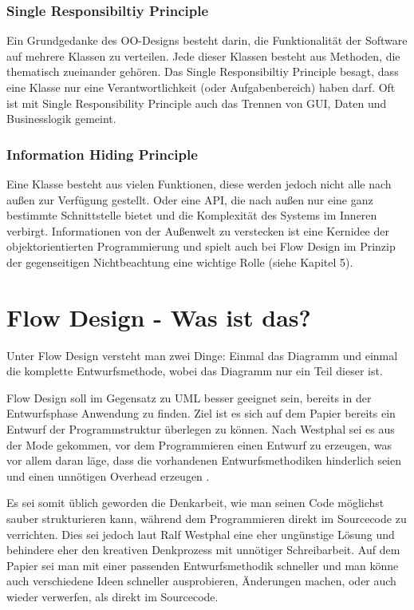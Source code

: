 \subsubsection{Single Responsibiltiy Principle}

Ein Grundgedanke des OO-Designs besteht darin, die Funktionalität der Software auf mehrere
Klassen zu verteilen. Jede dieser Klassen besteht aus Methoden, die thematisch zueinander gehören. 
Das Single Responsibiltiy Principle besagt, dass eine Klasse nur eine
Verantwortlichkeit (oder Aufgabenbereich) haben darf.
Oft ist mit Single Responsibility Principle auch das Trennen von
GUI, Daten und Businesslogik gemeint.

\subsubsection{Information Hiding Principle}

Eine Klasse besteht aus vielen Funktionen, diese werden jedoch nicht alle nach
außen zur Verfügung gestellt.
Oder eine API, die nach außen nur eine ganz bestimmte Schnittstelle bietet und
die Komplexität des Systems im Inneren verbirgt. Informationen von der
Außenwelt zu verstecken ist eine Kernidee der objektorientierten Programmierung
und spielt auch bei Flow Design im Prinzip der gegenseitigen Nichtbeachtung
eine wichtige Rolle (siehe Kapitel 5).



\section{Flow Design - Was ist das?}

Unter Flow Design versteht man zwei Dinge:
Einmal das Diagramm und einmal die komplette Entwurfsmethode, wobei das Diagramm nur ein Teil dieser ist.


Flow Design soll im Gegensatz zu UML besser geeignet sein, bereits in der Entwurfsphase Anwendung zu finden.
Ziel ist es sich auf dem Papier bereits ein Entwurf der Programmstruktur überlegen zu können.
Nach Westphal sei es aus der Mode gekommen, vor dem Programmieren einen Entwurf zu erzeugen, was vor allem daran läge, dass die vorhandenen
Entwurfsmethodiken hinderlich seien und einen unnötigen Overhead erzeugen
\cite[S. 2]{schummelzettel}.

Es sei somit üblich geworden die Denkarbeit, wie man seinen Code möglichst sauber strukturieren kann,
während dem Programmieren direkt im Sourcecode zu verrichten.
Dies sei jedoch laut Ralf Westphal eine eher ungünstige Lösung und behindere eher den kreativen Denkprozess mit
unnötiger Schreibarbeit.
Auf dem Papier sei man mit einer passenden Entwurfsmethodik schneller und man könne auch verschiedene Ideen schneller
ausprobieren, Änderungen machen, oder auch wieder verwerfen, als direkt im Sourcecode.

